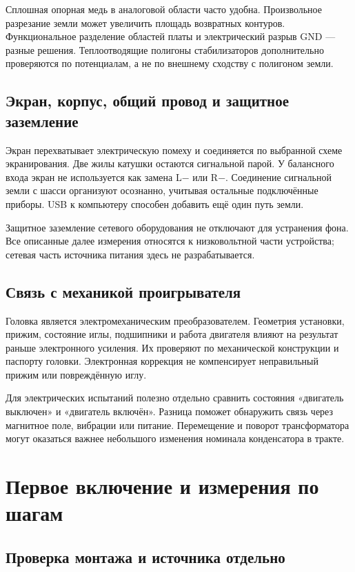 \documentclass[a4paper,11pt]{article}
\begin{document}
Сплошная опорная медь в аналоговой области часто удобна.
Произвольное разрезание земли может увеличить площадь возвратных контуров.
Функциональное разделение областей платы и электрический разрыв GND — разные
решения. Теплоотводящие полигоны стабилизаторов дополнительно проверяются по
потенциалам, а не по внешнему сходству с полигоном земли.

\subsection{Экран, корпус, общий провод и защитное заземление}

Экран перехватывает электрическую помеху и соединяется по выбранной схеме
экранирования. Две жилы катушки остаются сигнальной парой.
У балансного входа экран не используется как замена L− или R−.
Соединение сигнальной земли с шасси организуют осознанно, учитывая остальные
подключённые приборы. USB к компьютеру способен добавить ещё один путь земли.

Защитное заземление сетевого оборудования не отключают для устранения фона.
Все описанные далее измерения относятся к низковольтной части устройства;
сетевая часть источника питания здесь не разрабатывается.

\subsection{Связь с механикой проигрывателя}

Головка является электромеханическим преобразователем. Геометрия установки,
прижим, состояние иглы, подшипники и работа двигателя влияют на результат
раньше электронного усиления. Их проверяют по механической конструкции и
паспорту головки. Электронная коррекция не компенсирует неправильный прижим
или повреждённую иглу.

Для электрических испытаний полезно отдельно сравнить состояния
«двигатель выключен» и «двигатель включён». Разница поможет обнаружить связь
через магнитное поле, вибрации или питание. Перемещение и поворот трансформатора
могут оказаться важнее небольшого изменения номинала конденсатора в тракте.

\section{Первое включение и измерения по шагам}

\subsection{Проверка монтажа и источника отдельно}
\end{document}
